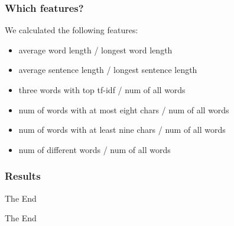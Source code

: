 \documentclass[unknownkeysallowed]{beamer}
\begin{document}
\begin{frame}
\frametitle{Which features?}
We calculated the following features:
\medskip
\begin{itemize}
\item average word length / longest word length
\bigskip
\item average sentence length / longest sentence length
\bigskip
\item three words with top tf-idf / num of all words
\bigskip
\item num of words with at most eight chars / num of all words
\bigskip
\item num of words with at least nine chars / num of all words
\bigskip
\item num of different words / num of all words
\end{itemize}

\end{frame}

\begin{frame}
\frametitle{Results}

\end{frame}

\begin{frame}{The End}
\Huge{\centerline{The End}}
\end{frame}

\end{document}
